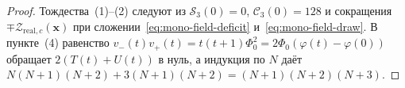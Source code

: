 \begin{proof}
\leanok
Тождества~(1)--(2) следуют из $\mathcal{S}_3(0) = 0$, $\mathcal{C}_3(0) = 128$ и сокращения $\mp\mathcal{Z}_{\mathrm{real},c}(\mathbf{x})$ при сложении~\eqref{eq:mono-field-deficit} и~\eqref{eq:mono-field-draw}. В пункте~(4) равенство $v_{-}(t)v_{+}(t) = t(t+1)\Phi_0^2 = 2\Phi_0(\varphi(t)-\varphi(0))$ обращает $2(T(t)+U(t))$ в нуль, а индукция по $N$ даёт $N(N+1)(N+2) + 3(N+1)(N+2) = (N+1)(N+2)(N+3)$.
\end{proof}

